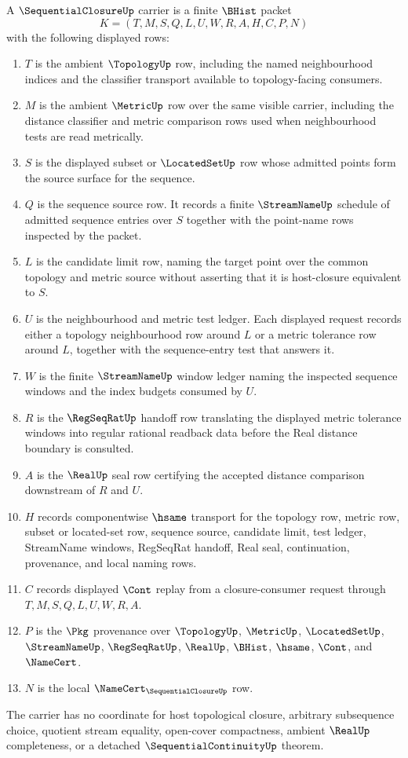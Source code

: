 \begin{definition}
\label{def:sequential-closure-carrier}
A $\SequentialClosureUp$ carrier is a finite $\BHist$ packet
$$
K=(T,M,S,Q,L,U,W,R,A,H,C,P,N)
$$
with the following displayed rows:
\begin{enumerate}
\item $T$ is the ambient $\TopologyUp$ row, including the named neighbourhood indices and the classifier transport available to topology-facing consumers.
\item $M$ is the ambient $\MetricUp$ row over the same visible carrier, including the distance classifier and metric comparison rows used when neighbourhood tests are read metrically.
\item $S$ is the displayed subset or $\LocatedSetUp$ row whose admitted points form the source surface for the sequence.
\item $Q$ is the sequence source row. It records a finite $\StreamNameUp$ schedule of admitted sequence entries over $S$ together with the point-name rows inspected by the packet.
\item $L$ is the candidate limit row, naming the target point over the common topology and metric source without asserting that it is host-closure equivalent to $S$.
\item $U$ is the neighbourhood and metric test ledger. Each displayed request records either a topology neighbourhood row around $L$ or a metric tolerance row around $L$, together with the sequence-entry test that answers it.
\item $W$ is the finite $\StreamNameUp$ window ledger naming the inspected sequence windows and the index budgets consumed by $U$.
\item $R$ is the $\RegSeqRatUp$ handoff row translating the displayed metric tolerance windows into regular rational readback data before the Real distance boundary is consulted.
\item $A$ is the $\RealUp$ seal row certifying the accepted distance comparison downstream of $R$ and $U$.
\item $H$ records componentwise $\hsame$ transport for the topology row, metric row, subset or located-set row, sequence source, candidate limit, test ledger, StreamName windows, RegSeqRat handoff, Real seal, continuation, provenance, and local naming rows.
\item $C$ records displayed $\Cont$ replay from a closure-consumer request through $T,M,S,Q,L,U,W,R,A$.
\item $P$ is the $\Pkg$ provenance over $\TopologyUp$, $\MetricUp$, $\LocatedSetUp$, $\StreamNameUp$, $\RegSeqRatUp$, $\RealUp$, $\BHist$, $\hsame$, $\Cont$, and $\NameCert$.
\item $N$ is the local $\NameCert_{\SequentialClosureUp}$ row.
\end{enumerate}
The carrier has no coordinate for host topological closure, arbitrary subsequence choice, quotient stream equality, open-cover compactness, ambient $\RealUp$ completeness, or a detached $\SequentialContinuityUp$ theorem.
\end{definition}


